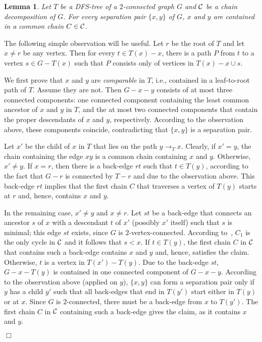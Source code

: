 \documentclass[paper=a4]{scrartcl}
\newtheorem{lemma}{Lemma}
\newcommand{\mqed}{\hfill$\Box$}
\newlength{\proofpostskipamount}\newlength{\proofpreskipamount}
\newenvironment{proof}{\par\vspace{\proofpreskipamount}\noindent{\textbf{Proof:}}\hspace{0.5em}}{\nopagebreak \strut\nopagebreak \hspace{\fill}\mqed\par\vspace{\proofpostskipamount}\noindent}
\begin{document}
\begin{lemma}\label{lem:separationpair}
Let $T$ be a DFS-tree of a $2$-connected graph $G$ and ${\mathcal{C}}$ be a chain decomposition of $G$. For every separation pair $\{x,y\}$ of $G$, $x$ and $y$ are contained in a common chain $C \in {\mathcal{C}}$.
\end{lemma}
\begin{proof} The following simple observation will be useful. Let $r$ be the root of $T$ and let $x \neq r$ be any vertex. Then for every $t \in T(x) - x$, there is a path $P$ from $t$ to a vertex $s \in G - T(x)$ such that $P$ consists only of vertices in $T(x)-x \cup s$.


We first prove that $x$ and $y$ are \emph{comparable} in $T$, i.e., contained in a leaf-to-root path of $T$. Assume they are not. Then $G-x-y$ consists of at most three connected components: one connected component containing the least common ancestor of $x$ and $y$ in $T$, and the at most two connected components that contain the proper descendants of $x$ and $y$, respectively. According to the observation above,
these components coincide, contradicting that $\{x,y\}$ is a separation pair.

Let $x'$ be the child of $x$ in $T$ that lies on the path $y \rightarrow_T x$. Clearly, if $x' = y$, the chain containing the edge $xy$ is a common chain containing $x$ and $y$. Otherwise, $x' \neq y$. If $x = r$, then there is a back-edge $rt$ such that $t \in T(y)$, according to the fact that $G - r$ is connected by $T - r$ and due to the observation above. This back-edge $rt$ implies that the first chain $C$ that traverses a vertex of $T(y)$ starts at $r$ and, hence, contains $x$ and $y$.

In the remaining case, $x' \neq y$ and $x \neq r$. Let $st$ be a back-edge that connects an ancestor $s$ of $x$ with a descendant $t$ of $x'$ (possibly $x'$ itself) such that $s$ is minimal; this edge $st$ exists, since $G$ is $2$-vertex-connected. According to~\cite{Schmidt2013a}, $C_1$ is the only cycle in ${\mathcal{C}}$ and it follows that $s < x$. If $t \in T(y)$, the first chain $C$ in ${\mathcal{C}}$ that contains such a back-edge contains $x$ and $y$ and, hence, satisfies the claim. Otherwise, $t$ is a vertex in $T(x')-T(y)$. Due to the back-edge $st$, $G-x-T(y)$ is contained in one connected component of $G-x-y$. According to the observation above (applied on $y$), $\{x,y\}$ can form a separation pair only if $y$ has a child $y'$ such that all back-edges that end in $T(y')$ start either in $T(y)$ or at $x$. Since $G$ is $2$-connected, there must be a back-edge from $x$ to $T(y')$. The first chain $C$ in ${\mathcal{C}}$ containing such a back-edge gives the claim, as it contains $x$ and $y$.
\end{proof}
\end{document}
